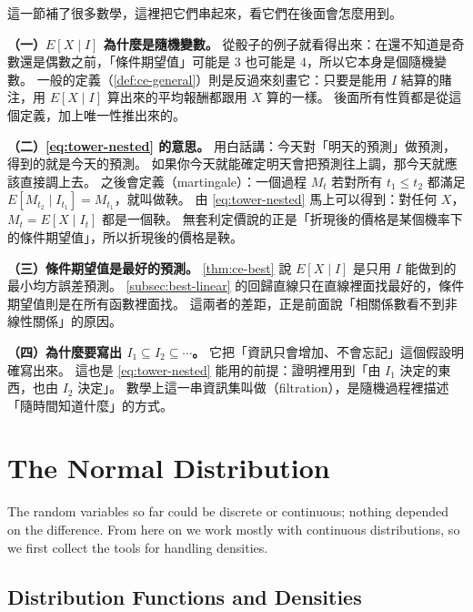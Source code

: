 \begin{remark}
	這一節補了很多數學，這裡把它們串起來，看它們在後面會怎麼用到。

	\textbf{（一）$E[X\mid I]$ 為什麼是隨機變數。}
	從骰子的例子就看得出來：在還不知道是奇數還是偶數之前，「條件期望值」可能是 $3$ 也可能是 $4$，所以它本身是個隨機變數。
	一般的定義（\autoref{def:ce-general}）則是反過來刻畫它：只要是能用 $I$ 結算的賭注，用 $E[X\mid I]$ 算出來的平均報酬都跟用 $X$ 算的一樣。
	後面所有性質都是從這個定義，加上唯一性推出來的。

	\textbf{（二）\eqref{eq:tower-nested} 的意思。}
	用白話講：今天對「明天的預測」做預測，得到的就是今天的預測。
	如果你今天就能確定明天會把預測往上調，那今天就應該直接調上去。
	之後會定義（martingale）：一個過程 $M_{t}$ 若對所有 $t_{1}\le t_{2}$ 都滿足 $E[M_{t_{2}}\mid I_{t_{1}}]=M_{t_{1}}$，就叫做鞅。
	由 \eqref{eq:tower-nested} 馬上可以得到：對任何 $X$，$M_{t}=E[X\mid I_{t}]$ 都是一個鞅。
	無套利定價說的正是「折現後的價格是某個機率下的條件期望值」，所以折現後的價格是鞅。

	\textbf{（三）條件期望值是最好的預測。}
	\autoref{thm:ce-best} 說 $E[X\mid I]$ 是只用 $I$ 能做到的最小均方誤差預測。
	\autoref{subsec:best-linear} 的回歸直線只在直線裡面找最好的，條件期望值則是在所有函數裡面找。
	這兩者的差距，正是前面說「相關係數看不到非線性關係」的原因。

	\textbf{（四）為什麼要寫出 $I_{1}\subseteq I_{2}\subseteq\cdots$。}
	它把「資訊只會增加、不會忘記」這個假設明確寫出來。
	這也是 \eqref{eq:tower-nested} 能用的前提：證明裡用到「由 $I_{1}$ 決定的東西，也由 $I_{2}$ 決定」。
	數學上這一串資訊集叫做（filtration），是隨機過程裡描述「隨時間知道什麼」的方式。
\end{remark}
\suppend

\section{The Normal Distribution}
\label{sec:normal}

\suppstart
The random variables so far could be discrete or continuous; nothing depended on the difference.
From here on we work mostly with continuous distributions, so we first collect the tools for handling densities.

\subsection{Distribution Functions and Densities}

